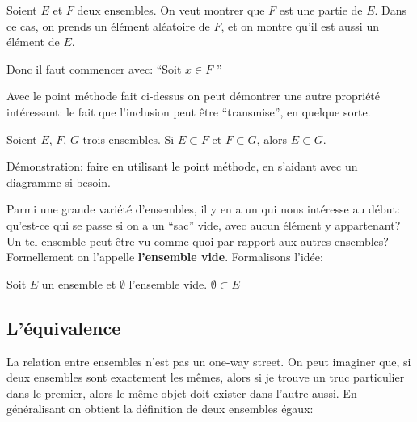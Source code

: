 \documentclass{article}
\begin{document}
\begin{tcolorbox}[colback=green!5!white,colframe=green!75!black,title=Point méthode 2.1]

Soient $E$ et $F$ deux ensembles. On veut montrer que $F$ est une partie de $E$. Dans ce cas, on prends un élément aléatoire de $F$, et on montre qu'il est aussi un élément de $E$.

Donc il faut commencer avec: ``Soit $x \in F$ ''

\end{tcolorbox}

Avec le point méthode fait ci-dessus on peut démontrer une autre propriété intéressant: le fait que l'inclusion peut être ``transmise'', en quelque sorte.

 \begin{tcolorbox}[colback=blue!5!white,colframe=blue!75!black,title=Propriété 2.1]

Soient $E$, $F$, $G$ trois ensembles. Si $E \subset F$ et $F \subset G$, alors $E \subset G$.

\tcblower

Démonstration: faire en utilisant le point méthode, en s'aidant avec un diagramme si besoin.
\end{tcolorbox} 




Parmi une grande variété d'ensembles, il y en a un qui nous intéresse au début: qu'est-ce qui se passe si on a un ``sac'' vide, avec aucun élément y appartenant? Un tel ensemble peut être vu comme quoi par rapport aux autres ensembles? Formellement on l'appelle \textbf{l'ensemble vide}. Formalisons l'idée:

 \begin{tcolorbox}[colback=blue!5!white,colframe=blue!75!black,title=Propriété 2.2]

Soit $E$ un ensemble et $\emptyset$ l'ensemble vide. $\emptyset \subset E$

\end{tcolorbox} 

\subsection{L'équivalence}


La relation entre ensembles n'est pas un one-way street. On peut imaginer que, si deux ensembles sont exactement les mêmes, alors si je trouve un truc particulier dans le premier, alors le même objet doit exister dans l'autre aussi. En généralisant on obtient la définition de deux ensembles égaux:
\end{document}
